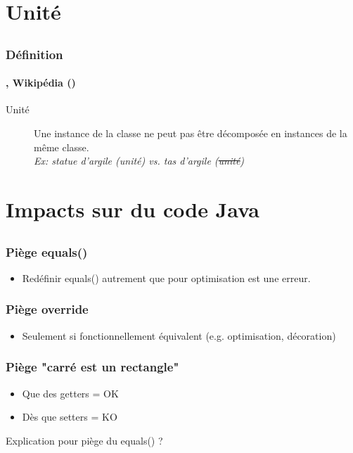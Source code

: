 \documentclass[draft]{beamer}
\DeclareRobustCommand{\todo}[1]{\ifdraft{\textbf{\textcolor{red}{[#1]}}}{}}
\newcommand{\citecustom}[2]{#2 (\citeyear{#1})}
\begin{document}
\section{Unité}
\subsection{}

\begin{frame}
\frametitle{Définition}
\framesubtitle{\cite{goos_ontological_2000,staab_overview_2004}, \citecustom{noauthor_ontoclean_2019}{Wikipédia}}
\begin{description}
 \item[Unité] Une instance de la classe ne peut pas être décomposée en instances de la même classe.\\
      {\footnotesize\textit{Ex: statue d'argile (unité) vs. tas d'argile (\sout{unité})}}
\end{description}
\todo{...}
\end{frame}

\section{Impacts sur du code Java}
\subsection{}

\begin{frame}
\frametitle{Piège equals()}
\begin{itemize}
 \item Redéfinir equals() autrement que pour optimisation est une erreur.
\end{itemize}
\end{frame}

\begin{frame}
\frametitle{Piège override}
\begin{itemize}
 \item Seulement si fonctionnellement équivalent (e.g. optimisation, décoration)
\end{itemize}
\end{frame}

\begin{frame}
\frametitle{Piège "carré est un rectangle"}
\begin{itemize}
 \item Que des getters = OK
 \item Dès que setters = KO
\end{itemize}
Explication pour piège du equals() ?
\end{frame}
\end{document}
